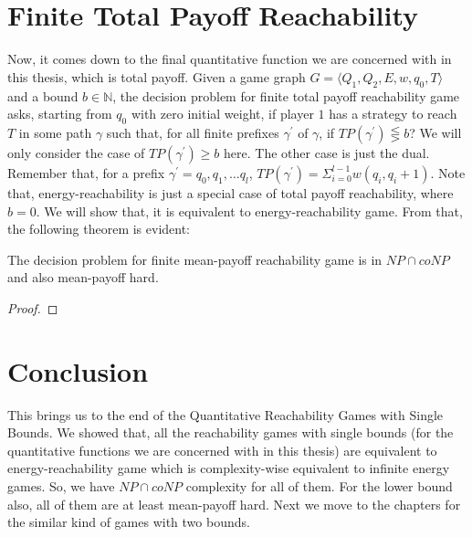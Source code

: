 \section{Finite Total Payoff Reachability}
Now, it comes down to the final quantitative function we are concerned with in this thesis, which is total payoff. Given a game graph $G=\langle Q_1, Q_2, E, w, q_0,T\rangle$ and a bound $b \in \mathbb{N}$, the decision problem for finite total payoff reachability game asks, starting from $q_0$ with zero initial weight, if player $1$ has a strategy to reach $T$ in some path $\gamma$ such that, for all finite prefixes $\gamma^{\prime}$ of $\gamma$, if $TP(\gamma^{\prime}) \lesseqgtr b$? We will only consider the case of  $TP(\gamma^{\prime}) \geq b$ here. The other case is just the dual. Remember that, for a prefix $\gamma^{\prime}= q_0,q_1,\ldots q_l$, $TP(\gamma^{\prime})= \Sigma_{i=0}^{l-1} w(q_i,q_i+1)$. Note that, energy-reachability is just a special case of total payoff reachability, where $b=0$. We will show that, it is equivalent to energy-reachability game. From that, the following theorem is evident:\\
\begin{theorem}
\label{fin-totalpayoff-thm}
The decision problem for finite mean-payoff reachability game is in $NP \cap coNP$ and also mean-payoff hard. 
\end{theorem}
\begin{proof}
\huge{}
\end{proof}

\section{Conclusion}
This brings us to the end of the Quantitative Reachability Games with Single Bounds. We showed that, all the reachability games with single bounds (for the quantitative functions we are concerned with in this thesis) are equivalent to energy-reachability game which is complexity-wise equivalent to infinite energy games. So, we have $NP \cap coNP$ complexity for all of them. For the lower bound also, all of them are at least mean-payoff hard. Next we move to the chapters for the similar kind of games with two bounds. 

